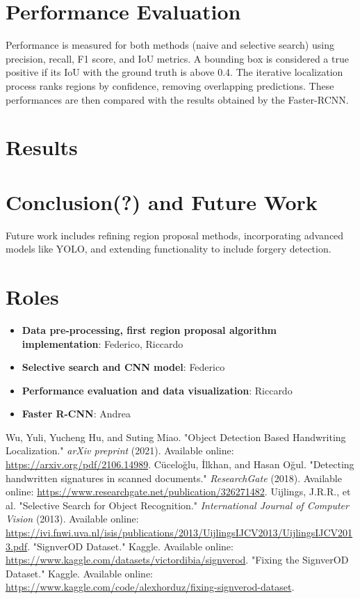 \documentclass[a4paper,12pt]{article}
\begin{document}
\section{Performance Evaluation}
Performance is measured for both methods (naive and selective search) using precision, recall, F1 score, and IoU metrics. A bounding box is considered a true positive if its IoU with the ground truth is above 0.4. The iterative localization process ranks regions by confidence, removing overlapping predictions. These performances are then compared with the results obtained by the Faster-RCNN.

\section{Results}



\section{Conclusion(?) and Future Work}
Future work includes refining region proposal methods, incorporating advanced models like YOLO, and extending functionality to include forgery detection.

\section{Roles}
\begin{itemize}
    \item \textbf{Data pre-processing, first region proposal algorithm implementation}: Federico, Riccardo
    \item \textbf{Selective search and CNN model}: Federico
    \item \textbf{Performance evaluation and data visualization}: Riccardo
    \item \textbf{Faster R-CNN}: Andrea
\end{itemize}

\begin{thebibliography}{9}
 Wu, Yuli, Yucheng Hu, and Suting Miao. "Object Detection Based Handwriting Localization." \textit{arXiv preprint} (2021). Available online: \url{https://arxiv.org/pdf/2106.14989}.
 Cüceloğlu, İlkhan, and Hasan Oğul. "Detecting handwritten signatures in scanned documents." \textit{ResearchGate} (2018). Available online: \url{https://www.researchgate.net/publication/326271482}.
 Uijlings, J.R.R., et al. "Selective Search for Object Recognition." \textit{International Journal of Computer Vision} (2013). Available online: \url{https://ivi.fnwi.uva.nl/isis/publications/2013/UijlingsIJCV2013/UijlingsIJCV2013.pdf}.
 "SignverOD Dataset." Kaggle. Available online: \url{https://www.kaggle.com/datasets/victordibia/signverod}.
 "Fixing the SignverOD Dataset." Kaggle. Available online: \url{https://www.kaggle.com/code/alexhorduz/fixing-signverod-dataset}.
\end{thebibliography}
\end{document}
